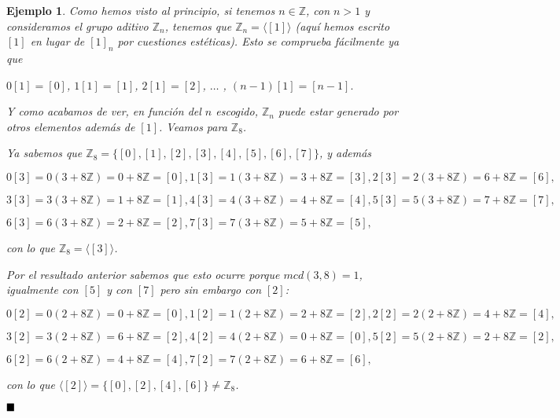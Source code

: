 \documentclass[12pt]{article}
\newtheorem{example}{Ejemplo}[theorem]
\begin{document}
\begin{example}Como hemos visto al principio, si tenemos $n \in \mathbb{Z}$, con $n>1$ y consideramos el grupo aditivo $\mathbb{Z}_{n}$, tenemos que $\mathbb{Z}_{n} = \langle \left[ 1 \right] \rangle$ (aquí hemos escrito $\left[ 1 \right]$ en lugar de $\left[ 1 \right]_{n}$ por cuestiones estéticas). Esto se comprueba fácilmente ya que 
\begin{center}
$0\left[ 1 \right] = \left[ 0 \right]$, $1\left[ 1 \right] = \left[ 1 \right]$, $2\left[ 1 \right] = \left[ 2 \right]$, $\ldots$ , $(n-1)\left[ 1 \right] = \left[ n-1 \right].$
\end{center}
Y como acabamos de ver, en función del $n$ escogido, $\mathbb{Z}_{n}$ puede estar generado por otros elementos además de $\left[ 1 \right]$. Veamos para $\mathbb{Z}_{8}$.

Ya sabemos que $\mathbb{Z}_{8} = \lbrace \left[ 0 \right], \left[ 1 \right], \left[ 2 \right], \left[ 3 \right], \left[ 4 \right], \left[ 5 \right], \left[ 6 \right], \left[ 7 \right] \rbrace$, y además

$0\left[ 3 \right] = 0(3 + 8\mathbb{Z}) = 0 +8\mathbb{Z} = \left[ 0 \right],1\left[ 3 \right] = 1(3 + 8\mathbb{Z}) = 3 +8\mathbb{Z} = \left[ 3 \right],2\left[ 3 \right] = 2(3 + 8\mathbb{Z}) = 6 +8\mathbb{Z} = \left[ 6 \right],$

$3\left[ 3 \right] = 3(3 + 8\mathbb{Z}) = 1 +8\mathbb{Z} = \left[ 1 \right],4\left[ 3 \right] = 4(3 + 8\mathbb{Z}) = 4 +8\mathbb{Z} = \left[ 4 \right], 5\left[ 3 \right] = 5(3 + 8\mathbb{Z}) = 7 +8\mathbb{Z} = \left[ 7 \right],$

$6\left[ 3 \right] = 6(3 + 8\mathbb{Z}) = 2 +8\mathbb{Z} = \left[ 2 \right], 7\left[ 3 \right] = 7(3 + 8\mathbb{Z}) = 5 +8\mathbb{Z} = \left[ 5 \right],$

con lo que $\mathbb{Z}_{8} = \langle \left[ 3 \right] \rangle$. 

Por el resultado anterior sabemos que esto ocurre porque $mcd(3,8)=1$, igualmente con $\left[ 5 \right]$ y con $\left[ 7 \right]$ pero sin embargo con $\left[ 2 \right]$:

$0\left[ 2 \right] = 0(2 + 8\mathbb{Z}) = 0 +8\mathbb{Z} = \left[ 0 \right],1\left[ 2 \right] = 1(2 + 8\mathbb{Z}) = 2 +8\mathbb{Z} = \left[ 2 \right],2\left[ 2 \right] = 2(2 + 8\mathbb{Z}) = 4 +8\mathbb{Z} = \left[ 4 \right],$

$3\left[ 2 \right] = 3(2 + 8\mathbb{Z}) = 6 +8\mathbb{Z} = \left[ 2 \right],4\left[ 2 \right] = 4(2 + 8\mathbb{Z}) = 0 +8\mathbb{Z} = \left[ 0 \right], 5\left[ 2 \right] = 5(2 + 8\mathbb{Z}) = 2 +8\mathbb{Z} = \left[ 2 \right],$

$6\left[ 2 \right] = 6(2 + 8\mathbb{Z}) = 4 +8\mathbb{Z} = \left[ 4 \right], 7\left[ 2 \right] = 7(2 + 8\mathbb{Z}) = 6 +8\mathbb{Z} = \left[ 6 \right],$

con lo que $\langle \left[ 2 \right] \rangle = \lbrace \left[ 0 \right], \left[ 2 \right], \left[ 4 \right], \left[ 6 \right] \rbrace \neq \mathbb{Z}_{8}$.
\end{example}
$\hfill \blacksquare$
\end{document}
